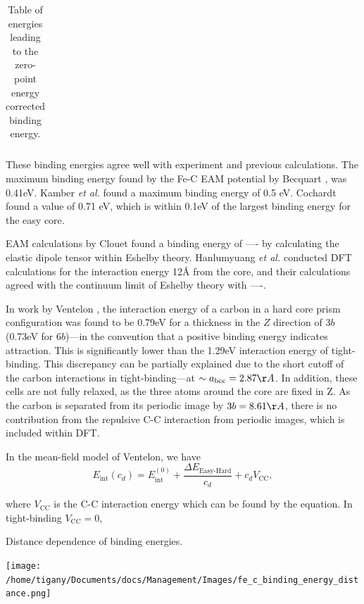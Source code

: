 \documentclass[a4paper]{article}
\begin{document}
{\begin{table}
\begin{tabular}{cccccc}
    \end{tabular}		
    \caption{Table of energies leading to the zero-point energy corrected binding energy. }
\end{table}

These binding energies agree well with experiment and previous
calculations. The maximum binding energy found by the Fe-C EAM
potential by Becquart \cite{Becquart2007}, was 0.41eV. Kamber
\emph{et al.} found a maximum binding energy of 0.5 eV. Cochardt
found a value of 0.71 eV, which is within 0.1eV of the largest
binding energy for the easy core. 

EAM calculations by Clouet \cite{Clouet2008} found a binding energy of ---- by calculating the
elastic dipole tensor within Eshelby theory. 
Hanlumyuang \emph{et al.} \cite{Hanlumyuang2010} conducted DFT calculations for the interaction energy 12\AA{} from the core,
and their calculations agreed with the continuum limit of Eshelby theory with ----. 


In work by Ventelon \cite{Ventelon2015}, the interaction energy of a carbon in a hard
core prism configuration was found to be 0.79eV for a thickness in the \(Z\) direction of 3\(b\) (0.73eV for \(6b\))---in the
convention that a positive binding energy indicates attraction. This is significantly lower than
the 1.29eV interaction energy of tight-binding. This discrepancy can be
partially explained due to the short cutoff of the carbon interactions in tight-binding---at
\(\sim a_{\text{bcc}} = 2.87 \AA\). In addition, these cells are not fully relaxed, as the three
atoms around the core are fixed in Z. As the carbon is separated from its periodic image by \(3b =
    8.61\AA\), there is no contribution from the repulsive C-C interaction from periodic images,
which is included within DFT.


In the mean-field model of Ventelon, we have
\[ E_{\text{int}}( c_d ) = E^{(0)}_{\text{int}} + \frac{\Delta E_{\text{Easy-Hard}}}{c_d} + c_d V_{\text{CC}} , \]

where \(V_{\text{CC}}\) is the C-C interaction energy which can be found by the equation. In
tight-binding \(V_{\text{CC}}= 0\), 



Distance dependence of binding energies. 

\begin{center}
\texttt{[image: /home/tigany/Documents/docs/Management/Images/fe\_c\_binding\_energy\_distance.png]}
\end{center}



}
\end{document}
